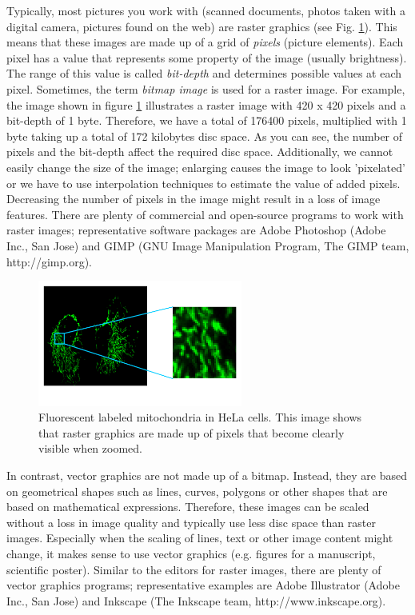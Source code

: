 Typically, most pictures you work with (scanned documents, photos taken with a digital camera, pictures found on the web) are raster graphics (see Fig. \ref{fig:bitmap-graphics}). This means that these images are made up of a grid of \emph{pixels} (picture elements). Each pixel has a value that represents some property of the image (usually brightness). The range of this value is called \emph{bit-depth} and determines possible values at each pixel. Sometimes, the term \emph{bitmap image} is used for a raster image. For example, the image shown in figure \ref{fig:bitmap-graphics} illustrates a raster image with 420 x 420 pixels and a bit-depth of 1 byte. Therefore, we have a total of 176400 pixels, multiplied with 1 byte taking up a total of 172 kilobytes disc space. As you can see, the number of pixels and the bit-depth affect the required disc space. Additionally, we cannot easily change the size of the image; enlarging causes the image to look 'pixelated' or we have to use interpolation techniques to estimate the value of added pixels. Decreasing the number of pixels in the image might result in a loss of image features. There are plenty of commercial and open-source programs to work with raster images; representative software packages are Adobe Photoshop (Adobe Inc., San Jose) and GIMP (GNU Image Manipulation Program, The GIMP team, http://gimp.org).

\begin{figure}[!ht]
	\centering
		\includegraphics[width=0.60\textwidth]{mod1/figures/bitmap-graphics.png}
	\caption{Fluorescent labeled mitochondria in HeLa cells. This image shows that raster graphics are made up of pixels that become clearly visible when zoomed.}
	\label{fig:bitmap-graphics}
\end{figure}


In contrast, vector graphics are not made up of a bitmap. Instead, they are based on geometrical shapes such as lines, curves, polygons or other shapes that are based on mathematical expressions. Therefore, these images can be scaled without a loss in image quality and typically use less disc space than raster images. Especially when the scaling of lines, text or other image content might change, it makes sense to use vector graphics (e.g. figures for a manuscript, scientific poster). Similar to the editors for raster images, there are plenty of vector graphics programs; representative examples are Adobe Illustrator (Adobe Inc., San Jose) and Inkscape (The Inkscape team, http://www.inkscape.org).

